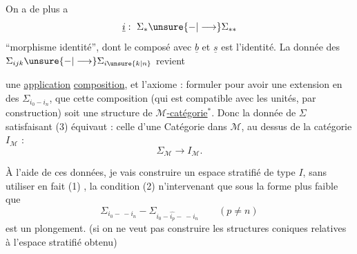 On a de plus a \unsure{:}
\[
 \underline{i}:\ \Sigma_*\unsure{-|\longrightarrow}\Sigma_{**}
\]
``morphisme identité'', dont le composé avec \(\underline b\) et
\(\underline s\) est l'identité. La donnée des
\(\Sigma_{ijk}\unsure{-|\longrightarrow}\Sigma_{i\unsure{k|n}}\) revient 


une \uline{application} \uline{composition}, et l'axiome :
formuler pour avoir une extension 
en des \(\Sigma_{i_0-i_n}\),  que cette composition
(qui est compatible avec les unités, \unsure{,|)}
par construction) soit une structure de
\uline{\(\mathcal M\)-catégorie}\(^*\). 
Donc la donnée de \(\Sigma\) satisfaisant (3)
équivaut : celle d'une Catégorie dans \(\mathcal M\),
au dessus de la catégorie \(I_{\mathcal M}\) :
\[
 \Sigma_{\mathcal M}\longrightarrow I_{\mathcal M}.
\]


À l'aide de ces données, je vais
construire un espace stratifié de type \(I\),
sans utiliser en fait 
(1) , la condition (2) n'intervenant
que sous la forme plus faible que
\[
 \Sigma_{i_0-\, -i_n}
 -\Sigma_{i_0-\widehat{i_p}-\, -i_n}\qquad(p\ne n)
\]
est un plongement. 
(si on ne veut pas construire les structures coniques
relatives à l'espace stratifié obtenu)

